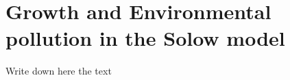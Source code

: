 \section{Growth and Environmental pollution in the Solow model}\label{Sec:env-pollut-Solow}
Write down here the text

